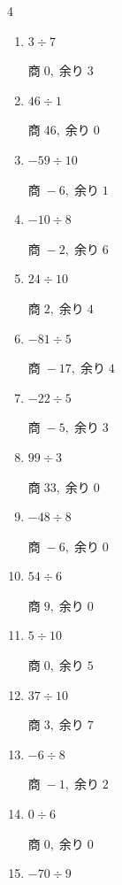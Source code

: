 \begin{multicols}{4}
\begin{enumerate}
        $商\; 11,\; 余り\; 5$

  \item $3 \div 7$

        $商\; 0,\; 余り\; 3$

  \item $46 \div 1$

        $商\; 46,\; 余り\; 0$

  \item $-59 \div 10$

        $商\; -6,\; 余り\; 1$

  \item $-10 \div 8$

        $商\; -2,\; 余り\; 6$

  \item $24 \div 10$

        $商\; 2,\; 余り\; 4$

  \item $-81 \div 5$

        $商\; -17,\; 余り\; 4$

  \item $-22 \div 5$

        $商\; -5,\; 余り\; 3$

\columnbreak %

  \item $99 \div 3$

        $商\; 33,\; 余り\; 0$

  \item $-48 \div 8$

        $商\; -6,\; 余り\; 0$

  \item $54 \div 6$

        $商\; 9,\; 余り\; 0$

  \item $5 \div 10$

        $商\; 0,\; 余り\; 5$

  \item $37 \div 10$

        $商\; 3,\; 余り\; 7$

  \item $-6 \div 8$

        $商\; -1,\; 余り\; 2$

  \item $0 \div 6$

        $商\; 0,\; 余り\; 0$

  \item $-70 \div 9$


\end{enumerate}
\end{multicols}
